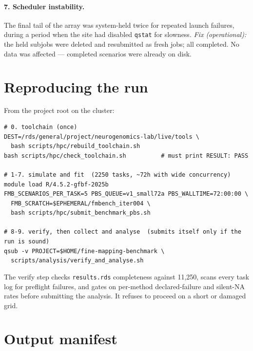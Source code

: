 \documentclass[11pt,a4paper]{article}
\newcommand{\file}[1]{\texttt{\small #1}}
\begin{document}
\paragraph{7. Scheduler instability.} The final tail of the array was
system-held twice for repeated launch failures, during a period when the site
had disabled \texttt{qstat} for slowness. \emph{Fix (operational):} the held
subjobs were deleted and resubmitted as fresh jobs; all completed. No data was
affected --- completed scenarios were already on disk.

\section{Reproducing the run}

From the project root on the cluster:

\begin{Verbatim}[fontsize=\small,frame=single]
# 0. toolchain (once)
DEST=/rds/general/project/neurogenomics-lab/live/tools \
  bash scripts/hpc/rebuild_toolchain.sh
bash scripts/hpc/check_toolchain.sh          # must print RESULT: PASS

# 1-7. simulate and fit  (2250 tasks, ~72h with wide concurrency)
module load R/4.5.2-gfbf-2025b
FMB_SCENARIOS_PER_TASK=5 PBS_QUEUE=v1_small72a PBS_WALLTIME=72:00:00 \
  FMB_SCRATCH=$EPHEMERAL/fmbench_iter004 \
  bash scripts/hpc/submit_benchmark_pbs.sh

# 8-9. verify, then collect and analyse  (submits itself only if the run is sound)
qsub -v PROJECT=$HOME/fine-mapping-benchmark \
  scripts/analysis/verify_and_analyse.sh
\end{Verbatim}

The verify step checks \file{results.rds} completeness against 11{,}250, scans
every task log for preflight failures, and gates on per-method declared-failure
and silent-NA rates before submitting the analysis. It refuses to proceed on a
short or damaged grid.

\section{Output manifest}
\end{document}
